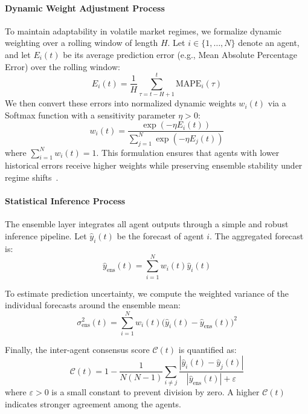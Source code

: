 \documentclass{ieeeaccess}
\begin{document}
\paragraph{Dynamic Weight Adjustment Process}
To maintain adaptability in volatile market regimes, we formalize dynamic weighting over a rolling window of length $H$. Let $i \in \{1,\dots,N\}$ denote an agent, and let $E_i(t)$ be its average prediction error (e.g., Mean Absolute Percentage Error) over the rolling window:
\begin{equation}
E_i(t) = \frac{1}{H}\sum_{\tau=t-H+1}^{t} \text{MAPE}_i(\tau)
\label{eq:agent_score}
\end{equation}
We then convert these errors into normalized dynamic weights $w_i(t)$ via a Softmax function with a sensitivity parameter $\eta > 0$:
\begin{equation}
w_i(t) = \frac{\exp(-\eta E_i(t))}{\sum_{j=1}^{N} \exp(-\eta E_j(t))}
\label{eq:dynamic_weight}
\end{equation}
where $\sum_{i=1}^{N} w_i(t) = 1$. This formulation ensures that agents with lower historical errors receive higher weights while preserving ensemble stability under regime shifts~\cite{li2022}.

\paragraph{Statistical Inference Process}
The ensemble layer integrates all agent outputs through a simple and robust inference pipeline. Let $\hat y_i(t)$ be the forecast of agent $i$. The aggregated forecast is:
\begin{equation}
\hat y_{\text{ens}}(t) = \sum_{i=1}^{N} w_i(t) \hat y_i(t)
\label{eq:ensemble_forecast}
\end{equation}

To estimate prediction uncertainty, we compute the weighted variance of the individual forecasts around the ensemble mean:
\begin{equation}
\sigma_{\text{ens}}^{2}(t) = \sum_{i=1}^{N} w_i(t) \Big(\hat y_i(t) - \hat y_{\text{ens}}(t)\Big)^2
\label{eq:ensemble_variance}
\end{equation}

Finally, the inter-agent consensus score $\mathcal{C}(t)$ is quantified as:
\begin{equation}
\mathcal{C}(t) = 1 - \frac{1}{N(N-1)} \sum_{i \neq j} \frac{\left|\hat y_i(t) - \hat y_j(t)\right|}{\left|\hat y_{\text{ens}}(t)\right| + \varepsilon}
\label{eq:consensus}
\end{equation}
where $\varepsilon > 0$ is a small constant to prevent division by zero. A higher $\mathcal{C}(t)$ indicates stronger agreement among the agents.
\end{document}

